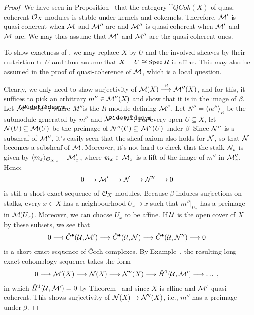 \documentclass[a4paper,parskip=half,numbers=enddot, DIV=12]{scrreprt}
\newcommand{\vC}{\v{C}}
\begin{document}
\begin{proof}
	We have seen in Proposition~ that the category $\cat{QCoh}(X)$ of quasi-coherent $\mathcal{O}_X$-modules is stable under kernels and cokernels. Therefore, $\mathcal{M}'$ is quasi-coherent when $\mathcal{M}$ and $\mathcal{M}''$ are and $\mathcal{M}''$ is quasi-coherent when $\mathcal{M}'$ and $\mathcal{M}$ are. We may thus assume that $\mathcal{M}'$ and $\mathcal{M}''$ are the quasi-coherent ones.
	
	To show exactness of , we may replace $X$ by $U$ and the involved sheaves by their restriction to $U$ and thus assume that $X=U\cong\operatorname{Spec} R$ is affine. This may also be assumed in the proof of quasi-coherence of $\mathcal{M}$, which is a local question.%
	
	Clearly, we only need to show surjectivity of $\Mm(X)\morphism[\beta]\Mm''(X)$, and for this, it suffices to pick an arbitrary $m''\in\mathcal{M}''(X)$ and show that it is in the image of $\beta$. Let $\Mm''=\snake{M}''$, where $M''$is the $R$-module defining $\mathcal{M}''$. Let $N''=\langle m''\rangle_R$ be the submodule generated by $m''$ and $\Nn''=\snake{N}''$. For every open $U\subseteq X$, let $\mathcal{N}(U)\subseteq \mathcal{M}(U)$ be the preimage of $\mathcal{N}''(U)\subseteq \mathcal{M}''(U)$ under $\beta$. Since $\mathcal{N}''$ is a subsheaf of $\mathcal{M}''$, it's easily seen that the sheaf axiom also holds for $\mathcal{N}$, so that $\mathcal{N}$ becomes a subsheaf of $\mathcal{M}$. Moreover, it's not hard to check that the stalk $\mathcal{N}_x$ is given by $\langle m_x\rangle_{\mathcal{O}_{X,x}}+\mathcal{M}_x'$, where $m_x\in\mathcal{M}_x$ is a lift of the image of $m''$ in $\mathcal{M}_x''$. Hence
	\begin{align*}
		0\morphism \Mm'\morphism \Nn\morphism \Nn''\morphism 0
	\end{align*}
	is still a short exact sequence of $\mathcal{O}_X$-modules. Because $\beta$ induces surjections on stalks, every $x\in X$ has a neighbourhood $U_x\ni x$ such that $m''|_{U_x}$ has a preimage in $\mathcal{M}(U_x)$. Moreover, we can choose $U_x$ to be affine. If $\mathcal{U}$ is the open cover of $X$ by these subsets, we see that
	\begin{align*}
		0\morphism \check{C}^\bullet(\Uu,\Mm')\morphism \check{C}^\bullet(\Uu,\Nn)\morphism \check{C}^\bullet(\Uu,\Nn'')\morphism 0
	\end{align*}
	is a short exact sequence of \vC ech complexes. By Example~, the resulting long exact cohomology sequence takes the form
	\begin{align*}
		0\morphism \Mm'(X)\morphism \Nn(X)\morphism \Nn''(X)\morphism\check{H}^1(\Uu,\Mm')\morphism \ldots\;,
	\end{align*}
	in which $\check{H}^1(\mathcal{U},\mathcal{M}')=0$ by Theorem~ and  since $X$ is affine and $\mathcal{M}'$ quasi-coherent. This shows surjectivity of $\Nn(X)\morphism\Nn''(X)$, i.e., $m''$ has a preimage under $\beta$.	
	

\end{proof}
\end{document}
